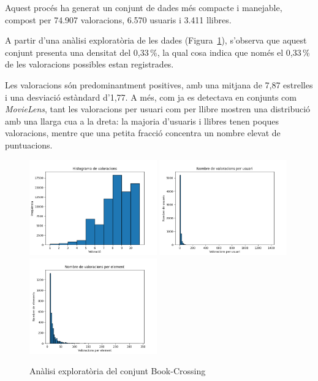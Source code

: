 \documentclass[a4paper,12pt]{report}
\begin{document}
Aquest procés ha generat un conjunt de dades més compacte i manejable, compost per 74.907 valoracions, 6.570 usuaris i 3.411 llibres.

A partir d’una anàlisi exploratòria de les dades (Figura~\ref{fig:analisis_books}), s’observa que aquest conjunt presenta una densitat del 0,33\,\%, la qual cosa indica que només el 0,33\,\% de les valoracions possibles estan registrades.

Les valoracions són predominantment positives, amb una mitjana de 7,87 estrelles i una desviació estàndard d’1,77. A més, com ja es detectava en conjunts com \emph{MovieLens}, tant les valoracions per usuari com per llibre mostren una distribució amb una llarga cua a la dreta: la majoria d’usuaris i llibres tenen poques valoracions, mentre que una petita fracció concentra un nombre elevat de puntuacions.

\begin{figure}[H]
    \centering
    \includegraphics[width=0.49\textwidth]{Figuras/books-ratings.png}
    \hfill
    \includegraphics[width=0.49\textwidth]{Figuras/books-users.png}
    \hfill
    \includegraphics[width=0.49\textwidth]{Figuras/books-items.png}
    \caption{Anàlisi exploratòria del conjunt Book-Crossing}
    \label{fig:analisis_books}
\end{figure}
\end{document}
